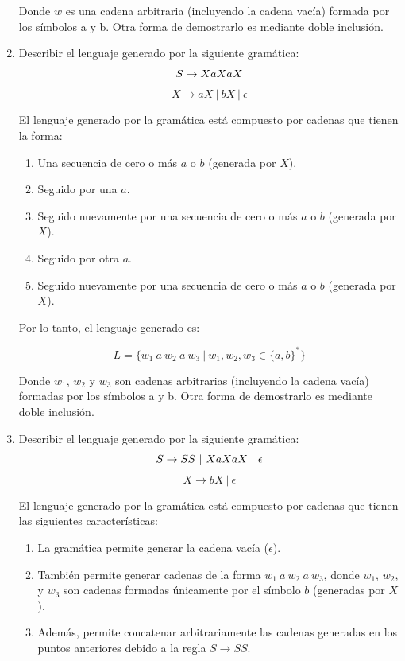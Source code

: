 \documentclass[12pt]{book} %
\begin{document}
\begin{enumerate}
\begin{solucion}[Ejercicio 1.b]
   Donde $w$ es una cadena arbitraria (incluyendo la cadena vacía) formada por los símbolos a y b. Otra forma de demostrarlo es mediante doble inclusión.

   \end{solucion}
\item
  Describir el lenguaje generado por la siguiente gramática: \[
   S \to XaXaX \\
   \] \[
   X \to aX \ | \ bX \ | \ \epsilon
   \]

  \begin{solucion}[Ejercicio 1.c]

   El lenguaje generado por la gramática está compuesto por cadenas que tienen la forma:

   \begin{enumerate}
       \item Una secuencia de cero o más $a$ o $b$ (generada por $X$).
       \item Seguido por una $a$.
       \item Seguido nuevamente por una secuencia de cero o más $a$ o $b$ (generada por $X$).
       \item Seguido por otra $a$.
       \item Seguido nuevamente por una secuencia de cero o más $a$ o $b$ (generada por $X$).
   \end{enumerate}

   Por lo tanto, el lenguaje generado es:

   $$
   L = \{ w_1 \ a \ w_2 \ a \ w_3  \ | \ w_1, w_2, w_3 \in \{a, b\}^* \}
   $$

   Donde $w_1$, $w_2$ y $w_3$ son cadenas arbitrarias (incluyendo la cadena vacía) formadas por los símbolos a y b. Otra forma de demostrarlo es mediante doble inclusión.

   \end{solucion}
\item
  Describir el lenguaje generado por la siguiente gramática: \[
   S \to SS \ | \ XaXaX \ | \ \epsilon \\
   \] \[
   X \to bX \ | \ \epsilon
   \]

  \begin{solucion}[Ejercicio 1.d]

   El lenguaje generado por la gramática está compuesto por cadenas que tienen las siguientes características:

   \begin{enumerate}
       \item La gramática permite generar la cadena vacía ($\epsilon$).
       \item También permite generar cadenas de la forma $w_1 \ a \ w_2 \ a \ w_3 $, donde $w_1$, $w_2$, y $w_3$ son cadenas formadas únicamente por el símbolo $b$ (generadas por $X$).
       \item Además, permite concatenar arbitrariamente las cadenas generadas en los puntos anteriores debido a la regla $S \to SS$.
   \end{enumerate}


\end{solucion}
\end{enumerate}
\end{document}
